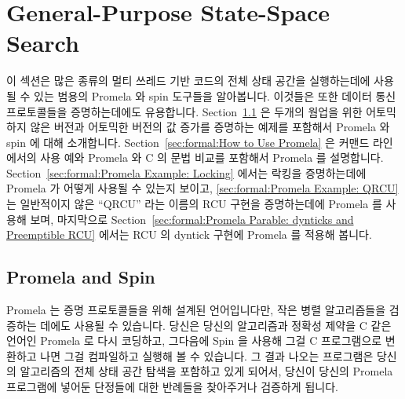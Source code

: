 
\section{General-Purpose State-Space Search}
\label{sec:formal:General-Purpose State-Space Search}

이 섹션은 많은 종류의 멀티 쓰레드 기반 코드의 전체 상태 공간을 실행하는데에
사용될 수 있는 범용의 Promela 와 spin 도구들을 알아봅니다.
이것들은 또한 데이터 통신 프로토콜들을 증명하는데에도 유용합니다.
Section~\ref{sec:formal:Promela and Spin}
은 두개의 웜업을 위한 어토믹 하지 않은 버전과 어토믹한 버전의 값 증가를
증명하는 예제를 포함해서 Promela 와 spin 에 대해 소개합니다.
Section~\ref{sec:formal:How to Use Promela}
은 커맨드 라인에서의 사용 예와 Promela 와 C 의 문법 비교를 포함해서 Promela 를
설명합니다.
Section~\ref{sec:formal:Promela Example: Locking}
에서는 락킹을 증명하는데에 Promela 가 어떻게 사용될 수 있는지 보이고,
\ref{sec:formal:Promela Example: QRCU}
는 일반적이지 않은 ``QRCU'' 라는 이름의 RCU 구현을 증명하는데에 Promela 를
사용해 보며, 마지막으로
Section~\ref{sec:formal:Promela Parable: dynticks and Preemptible RCU}
에서는 RCU 의 dyntick 구현에 Promela 를 적용해 봅니다.
\iffalse

This section features the general-purpose Promela and spin tools,
which may be used to carry out a full
state-space search of many types of multi-threaded code.
They are also quite useful for verifying data communication protocols.
Section~\ref{sec:formal:Promela and Spin}
introduces Promela and spin, including a couple of warm-up exercises
verifying both non-atomic and atomic increment.
Section~\ref{sec:formal:How to Use Promela}
describes use of Promela, including example command lines and a
comparison of Promela syntax to that of C.
Section~\ref{sec:formal:Promela Example: Locking}
shows how Promela may be used to verify locking,
\ref{sec:formal:Promela Example: QRCU}
uses Promela to verify an unusual implementation of RCU named ``QRCU'',
and finally
Section~\ref{sec:formal:Promela Parable: dynticks and Preemptible RCU}
applies Promela to RCU's dyntick-idle implementation.
\fi

\subsection{Promela and Spin}
\label{sec:formal:Promela and Spin}

Promela 는 증명 프로토콜들을 위해 설계된 언어입니다만, 작은 병렬 알고리즘들을
검증하는 데에도 사용될 수 있습니다.
당신은 당신의 알고리즘과 정확성 제약을 C 같은 언어인 Promela 로 다시 코딩하고,
그다음에 Spin 을 사용해 그걸 C 프로그램으로 변환하고 나면 그걸 컴파일하고
실행해 볼 수 있습니다.
그 결과 나오는 프로그램은 당신의 알고리즘의 전체 상태 공간 탐색을 포함하고 있게
되어서, 당신이 당신의 Promela 프로그램에 넣어둔 단정들에 대한 반례들을
찾아주거나 검증하게 됩니다.
\iffalse

